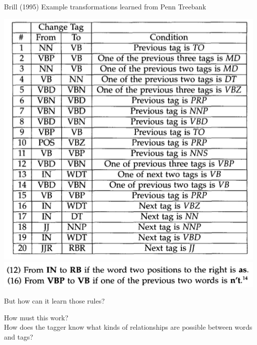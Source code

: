 \documentclass[9pt,xcolor=pdftex,dvipsnames,table]{beamer}
\begin{document}
\begin{frame}{Brill (1995) Example transformations learned from Penn Treebank}

	\begin{center}
		\includegraphics[width=.55\paperwidth]{brill3}\\
		\includegraphics[width=.75\paperwidth]{brill4}
	\end{center}
\end{frame}

\begin{frame}{But how can it learn those rules?}

	\begin{center}
		{\large How must this work?\\How does the tagger know what kinds of relationships are possible between words and tags?}
	\end{center}
\end{frame}
\end{document}
